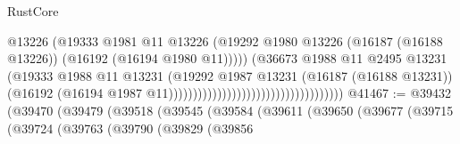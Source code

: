 \begin{lexlean}{RustCore}
\begin{coremodule}
                                                                    @13226
                                                                    (@19333
                                                                      @1981
                                                                      @11
                                                                      @13226
                                                                      (@19292
                                                                        @1980
                                                                        @13226
                                                                        (@16187 (@16188 @13226))
                                                                        (@16192
                                                                          (@16194 @1980 @11)))))
                                                                  (@36673
                                                                    @1988
                                                                    @11
                                                                    @2495
                                                                    @13231
                                                                    (@19333
                                                                      @1988
                                                                      @11
                                                                      @13231
                                                                      (@19292
                                                                        @1987
                                                                        @13231
                                                                        (@16187 (@16188 @13231))
                                                                        (@16192
                                                                          (@16194
                                                                            @1987
                                                                            @11))))))))))))))))))))))))))))))))))))
@41467 := @39432
    (@39470
      (@39479
        (@39518
          (@39545
            (@39584
              (@39611
                (@39650
                  (@39677
                    (@39715
                      (@39724
                        (@39763
                          (@39790
                            (@39829
                              (@39856

\end{coremodule}
\end{lexlean}

